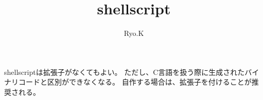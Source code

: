 \documentclass[a4paper, 12pt]{ltjsbook}
\begin{document}
\title{shellscript}
\author{Ryo.K}
\maketitle

shellscriptは拡張子がなくてもよい。
ただし、C言語を扱う際に生成されたバイナリコードと区別ができなくなる。
自作する場合は、拡張子を付けることが推奨される。
\end{document}
